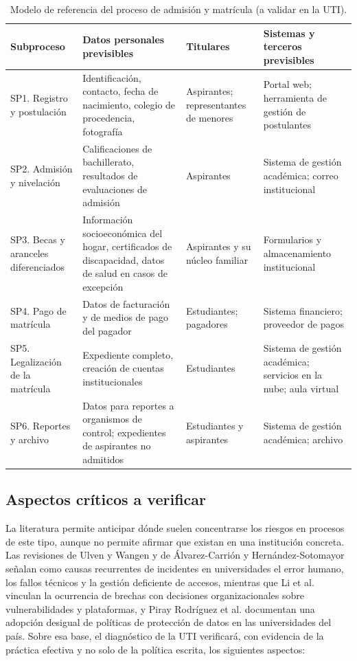 \begin{table}[htbp]
  \centering
  \caption{Modelo de referencia del proceso de admisión y matrícula (a validar en la UTI).}
  \label{tab:subprocesos}
  \footnotesize
  \renewcommand{\arraystretch}{1.2}
  \begin{tabularx}{\textwidth}{|p{2.6cm}|L|p{2.4cm}|L|}
    \hline
    \textbf{Subproceso} & \textbf{Datos personales previsibles} & \textbf{Titulares} & \textbf{Sistemas y terceros previsibles} \\
    \hline
    SP1. Registro y postulación & Identificación, contacto, fecha de nacimiento, colegio de procedencia, fotografía & Aspirantes; representantes de menores & Portal web; herramienta de gestión de postulantes \\
    \hline
    SP2. Admisión y nivelación & Calificaciones de bachillerato, resultados de evaluaciones de admisión & Aspirantes & Sistema de gestión académica; correo institucional \\
    \hline
    SP3. Becas y aranceles diferenciados & Información socioeconómica del hogar, certificados de discapacidad, datos de salud en casos de excepción & Aspirantes y su núcleo familiar & Formularios y almacenamiento institucional \\
    \hline
    SP4. Pago de matrícula & Datos de facturación y de medios de pago del pagador & Estudiantes; pagadores & Sistema financiero; proveedor de pagos \\
    \hline
    SP5. Legalización de la matrícula & Expediente completo, creación de cuentas institucionales & Estudiantes & Sistema de gestión académica; servicios en la nube; aula virtual \\
    \hline
    SP6. Reportes y archivo & Datos para reportes a organismos de control; expedientes de aspirantes no admitidos & Estudiantes y aspirantes & Sistema de gestión académica; archivo \\
    \hline
  \end{tabularx}
  \raggedright
\end{table}

\subsection{Aspectos críticos a verificar}

La literatura permite anticipar dónde suelen concentrarse los riesgos en procesos de este tipo, aunque no permite afirmar que existan en una institución concreta. Las revisiones de Ulven y Wangen \cite{ulven2021systematic} y de Álvarez-Carrión y Hernández-Sotomayor \cite{alvarez2024proteccion} señalan como causas recurrentes de incidentes en universidades el error humano, los fallos técnicos y la gestión deficiente de accesos, mientras que Li et al. \cite{li2023breach} vinculan la ocurrencia de brechas con decisiones organizacionales sobre vulnerabilidades y plataformas, y Piray Rodríguez et al. \cite{piray2026garantias} documentan una adopción desigual de políticas de protección de datos en las universidades del país. Sobre esa base, el diagnóstico de la UTI verificará, con evidencia de la práctica efectiva y no solo de la política escrita, los siguientes aspectos:

